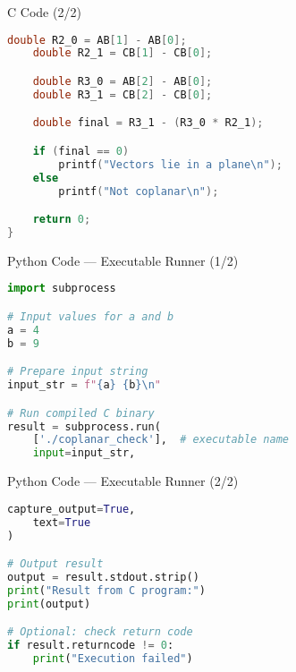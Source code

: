 \documentclass{beamer}
\begin{document}
\begin{frame}[fragile]{C Code  (2/2)}
\begin{lstlisting}[language=C]
    double R2_0 = AB[1] - AB[0];
    double R2_1 = CB[1] - CB[0];

    double R3_0 = AB[2] - AB[0];
    double R3_1 = CB[2] - CB[0];

    double final = R3_1 - (R3_0 * R2_1);

    if (final == 0)
        printf("Vectors lie in a plane\n");
    else
        printf("Not coplanar\n");

    return 0;
}
\end{lstlisting}
\end{frame}

\begin{frame}[fragile]{Python Code — Executable Runner (1/2)}
\begin{lstlisting}[language=Python]
import subprocess

# Input values for a and b
a = 4
b = 9

# Prepare input string
input_str = f"{a} {b}\n"

# Run compiled C binary
result = subprocess.run(
    ['./coplanar_check'],  # executable name
    input=input_str,
\end{lstlisting}
\end{frame}

\begin{frame}[fragile]{Python Code — Executable Runner (2/2)}
\begin{lstlisting}[language=Python]
    capture_output=True,
    text=True
)

# Output result
output = result.stdout.strip()
print("Result from C program:")
print(output)

# Optional: check return code
if result.returncode != 0:
    print("Execution failed")
\end{lstlisting}
\end{frame}
\end{document}
